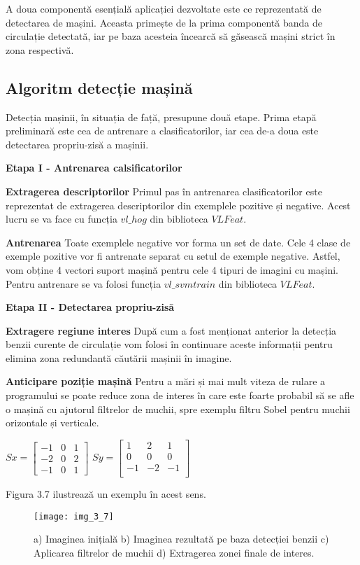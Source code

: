 A doua componentă esențială aplicației dezvoltate este ce reprezentată de detectarea de mașini. Aceasta primește de la prima componentă banda de circulație detectată, iar pe baza acesteia încearcă să găsească mașini strict în zona respectivă.
\subsection{Algoritm detecție mașină}
Detecția mașinii, în situația de față, presupune două etape. Prima etapă preliminară este cea de antrenare a clasificatorilor, iar cea de-a doua este detectarea propriu-zisă a mașinii.

\textbf{Etapa I - Antrenarea calsificatorilor}

\textbf{Extragerea descriptorilor}
Primul pas în antrenarea clasificatorilor este reprezentat de extragerea descriptorilor din exemplele pozitive și negative. 
Acest lucru se va face cu funcția $vl\_hog$ din biblioteca $VLFeat$. 

\textbf{Antrenarea}
Toate exemplele negative vor forma un set de date. Cele 4 clase de exemple pozitive vor fi antrenate separat cu setul de exemple negative. Astfel, vom obține 4 vectori suport mașină pentru cele 4 tipuri de imagini cu mașini. 
Pentru antrenare se va folosi funcția $vl\_svmtrain$ din biblioteca $VLFeat$.

\textbf{Etapa II - Detectarea propriu-zisă}

\textbf{Extragere regiune interes}
După cum a fost menționat anterior la detecția benzii curente de circulație vom folosi în continuare aceste informații pentru elimina zona redundantă căutării mașinii în imagine.

\textbf{Anticipare poziție mașină}
Pentru a mări și mai mult viteza de rulare a programului se poate reduce zona de interes în care este foarte probabil să se afle o mașină cu ajutorul filtrelor de muchii, spre exemplu filtru Sobel pentru muchii orizontale și verticale.
\begin{center}
	$ Sx = 
	\begin{bmatrix}
	-1 & 0 & 1 \\
	-2 & 0 & 2 \\
	-1 & 0 & 1
	\end{bmatrix}
	$
	$ Sy = 
	\begin{bmatrix}
	1 & 2 & 1 \\
	0 & 0 & 0 \\
	-1 & -2 & -1 \\
	\end{bmatrix}
	$
\end{center}
Figura 3.7 ilustrează un exemplu în acest sens.
\begin{figure}[!h]
	\centering
	\texttt{[image: img\_3\_7]}
	\caption[Regiune interes detecție mașină]{a) Imaginea inițială b) Imaginea rezultată pe baza detecției benzii c) Aplicarea filtrelor de muchii d) Extragerea zonei finale de interes.}
\end{figure}

